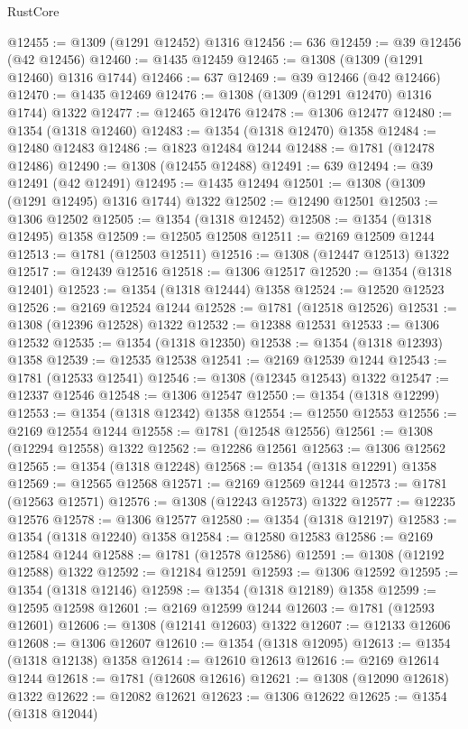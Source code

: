 \begin{lexlean}{RustCore}
\begin{coremodule}
@12455 := @1309 (@1291 @12452) @1316
@12456 := 636
@12459 := @39 @12456 (@42 @12456)
@12460 := @1435 @12459
@12465 := @1308 (@1309 (@1291 @12460) @1316 @1744)
@12466 := 637
@12469 := @39 @12466 (@42 @12466)
@12470 := @1435 @12469
@12476 := @1308 (@1309 (@1291 @12470) @1316 @1744) @1322
@12477 := @12465 @12476
@12478 := @1306 @12477
@12480 := @1354 (@1318 @12460)
@12483 := @1354 (@1318 @12470) @1358
@12484 := @12480 @12483
@12486 := @1823 @12484 @1244
@12488 := @1781 (@12478 @12486)
@12490 := @1308 (@12455 @12488)
@12491 := 639
@12494 := @39 @12491 (@42 @12491)
@12495 := @1435 @12494
@12501 := @1308 (@1309 (@1291 @12495) @1316 @1744) @1322
@12502 := @12490 @12501
@12503 := @1306 @12502
@12505 := @1354 (@1318 @12452)
@12508 := @1354 (@1318 @12495) @1358
@12509 := @12505 @12508
@12511 := @2169 @12509 @1244
@12513 := @1781 (@12503 @12511)
@12516 := @1308 (@12447 @12513) @1322
@12517 := @12439 @12516
@12518 := @1306 @12517
@12520 := @1354 (@1318 @12401)
@12523 := @1354 (@1318 @12444) @1358
@12524 := @12520 @12523
@12526 := @2169 @12524 @1244
@12528 := @1781 (@12518 @12526)
@12531 := @1308 (@12396 @12528) @1322
@12532 := @12388 @12531
@12533 := @1306 @12532
@12535 := @1354 (@1318 @12350)
@12538 := @1354 (@1318 @12393) @1358
@12539 := @12535 @12538
@12541 := @2169 @12539 @1244
@12543 := @1781 (@12533 @12541)
@12546 := @1308 (@12345 @12543) @1322
@12547 := @12337 @12546
@12548 := @1306 @12547
@12550 := @1354 (@1318 @12299)
@12553 := @1354 (@1318 @12342) @1358
@12554 := @12550 @12553
@12556 := @2169 @12554 @1244
@12558 := @1781 (@12548 @12556)
@12561 := @1308 (@12294 @12558) @1322
@12562 := @12286 @12561
@12563 := @1306 @12562
@12565 := @1354 (@1318 @12248)
@12568 := @1354 (@1318 @12291) @1358
@12569 := @12565 @12568
@12571 := @2169 @12569 @1244
@12573 := @1781 (@12563 @12571)
@12576 := @1308 (@12243 @12573) @1322
@12577 := @12235 @12576
@12578 := @1306 @12577
@12580 := @1354 (@1318 @12197)
@12583 := @1354 (@1318 @12240) @1358
@12584 := @12580 @12583
@12586 := @2169 @12584 @1244
@12588 := @1781 (@12578 @12586)
@12591 := @1308 (@12192 @12588) @1322
@12592 := @12184 @12591
@12593 := @1306 @12592
@12595 := @1354 (@1318 @12146)
@12598 := @1354 (@1318 @12189) @1358
@12599 := @12595 @12598
@12601 := @2169 @12599 @1244
@12603 := @1781 (@12593 @12601)
@12606 := @1308 (@12141 @12603) @1322
@12607 := @12133 @12606
@12608 := @1306 @12607
@12610 := @1354 (@1318 @12095)
@12613 := @1354 (@1318 @12138) @1358
@12614 := @12610 @12613
@12616 := @2169 @12614 @1244
@12618 := @1781 (@12608 @12616)
@12621 := @1308 (@12090 @12618) @1322
@12622 := @12082 @12621
@12623 := @1306 @12622
@12625 := @1354 (@1318 @12044)

\end{coremodule}
\end{lexlean}
